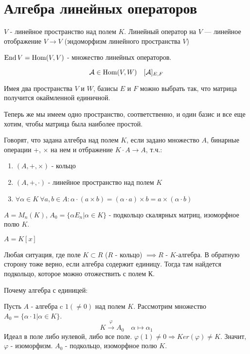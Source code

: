 \documentclass[main]{subfiles}
\begin{document}
\chapter{Алгебра линейных операторов}
\begin{definition} 
$V$ - линейное пространство над полем $K$. 
Линейный оператор на $V$ — линейное отображение $V \to V$ (эндоморфизм линейного пространства $V$)
\end{definition}
\begin{definition} 
$\operatorname{End} V = \operatorname{Hom}(V, V)$ - множество линейных операторов.
\end{definition}

$$\mathcal{A} \in \operatorname{Hom} (V, W) \quad [\mathcal{A}]_{E,F}$$

Имея два пространства $V$ и $W$, базисы $E$ и $F$ можно выбрать так, что матрица получится окаймленной единичной.

Теперь же мы имеем одно пространство, соответственно, и один базис и все еще хотим, чтобы матрица была наиболее простой. 

\begin{definition} 
    Говорят, что задана алгебра над полем $K$, если задано множество $A$, бинарные операции +, $\times$ на нем и отбражение $K \cdot A \to A$, т.ч.:
    \begin{enumerate}
        \item $(A,+, \times)$ - кольцо 
        \item $(A,+, \cdot)$ - линейное пространство над полем $K$
        \item $\forall \alpha \in K \  \forall a, b \in A : \alpha \cdot (a \times b) = (\alpha \cdot a) \times b = a \times (\alpha \cdot b)$
    \end{enumerate}
\end{definition}

\begin{example}
    $A = M_n(K)$, 
    $A_0 = \{ \alpha E_n | \alpha \in K\}$ - подкольцо скалярных матриц, изоморфное полю $K$.
\end{example}

\begin{example}
    $A = K[x]$
\end{example}   
\begin{example}
    Любая ситуация, где поле $K \subset R$ ($R$ - кольцо) $\implies R$ - $K$-алгебра. В обратную сторону тоже верно, если алгебра содержит единицу. Тогда там найдется подкольцо, которое можно отожествить с полем К.
    
    Почему алгебра с единицей: 

    Пусть $A$ - алгебра c $1(\neq0)$ над полем $K$.
    Рассмотрим множество $A_0 = \{\alpha \cdot 1| \alpha \in K\}$. 
    $$K \xrightarrow{\varphi} A_0 \quad \alpha \mapsto \alpha_1$$
    Идеал в поле либо нулевой, либо все поле. 
    $\varphi(1) \neq 0 \Rightarrow Ker(\varphi)\neq K$. 
    Значит,  $\varphi$ - изоморфизм. $A_0$ - подкольцо, изоморфное полю $K$.
\end{example}
\end{document}
